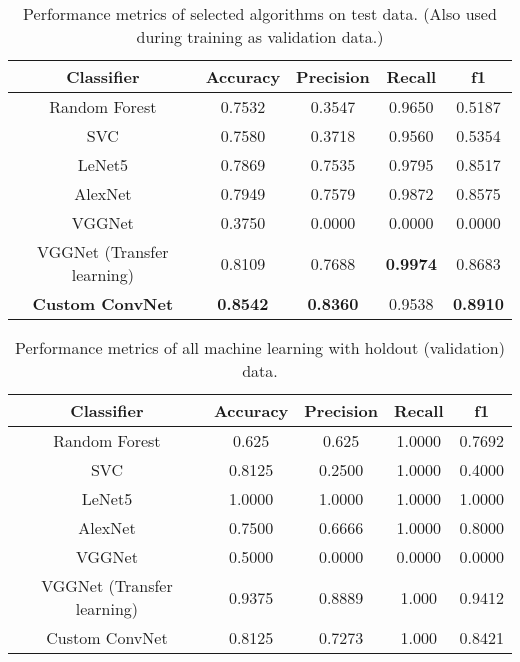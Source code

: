 \begin{table}[H]
    \centering
    \begin{tabular}{||c c c c c||} 
    \hline
    Classifier & Accuracy & Precision & Recall & f1\\ [0.5ex] 
    \hline\hline
    Random Forest & 0.7532 & 0.3547 & 0.9650 & 0.5187\\ 
    \hline
    SVC & 0.7580 & 0.3718 & 0.9560 & 0.5354\\
    \hline
    LeNet5 & 0.7869 & 0.7535 & 0.9795 & 0.8517\\
    \hline
    AlexNet & 0.7949 & 0.7579 & 0.9872 & 0.8575\\
    \hline
    VGGNet & 0.3750 & 0.0000 & 0.0000 & 0.0000\\
    \hline
    VGGNet (Transfer learning) & 0.8109 & 0.7688 & \textbf{0.9974} & 0.8683\\
    \hline
    \textbf{Custom ConvNet} & \textbf{0.8542} & \textbf{0.8360} & 0.9538 & \textbf{0.8910}\\
    \hline
    \end{tabular}
    \caption{Performance metrics of selected algorithms on test data. (Also used during training as validation data.)}
    \label{table:allmlmetrics}
\end{table}

\begin{table}[H]
    \centering
    \begin{tabular}{||c c c c c||} 
    \hline
    Classifier & Accuracy & Precision & Recall & f1\\ [0.5ex] 
    \hline\hline
    Random Forest & 0.625 & 0.625 & 1.0000 & 0.7692  \\ 
    \hline
    SVC & 0.8125 & 0.2500 & 1.0000 & 0.4000  \\
    \hline
    LeNet5 & 1.0000 & 1.0000 & 1.0000 & 1.0000\\
    \hline
    AlexNet & 0.7500 & 0.6666 & 1.0000 & 0.8000\\
    \hline
    VGGNet & 0.5000 & 0.0000 & 0.0000 & 0.0000\\
    \hline
    VGGNet (Transfer learning) & 0.9375 & 0.8889 & 1.000 & 0.9412\\
    \hline
    Custom ConvNet & 0.8125 & 0.7273 & 1.000 & 0.8421\\
    \hline
    \end{tabular}
    \caption{Performance metrics of all machine learning with holdout (validation) data.}
    \label{table:allvalmetrics}
\end{table}


